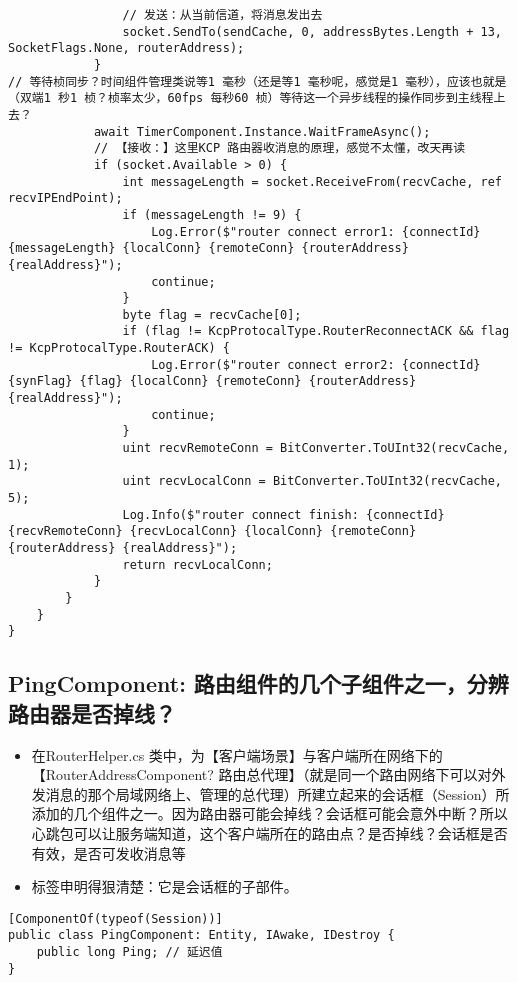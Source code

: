 \documentclass[9pt, b5paper]{article}
\begin{document}
\begin{verbatim}
                // 发送：从当前信道，将消息发出去
                socket.SendTo(sendCache, 0, addressBytes.Length + 13, SocketFlags.None, routerAddress);
            }
// 等待桢同步？时间组件管理类说等1 毫秒（还是等1 毫秒呢，感觉是1 毫秒），应该也就是（双端1 秒1 桢？桢率太少，60fps 每秒60 桢）等待这一个异步线程的操作同步到主线程上去？
            await TimerComponent.Instance.WaitFrameAsync(); 
            // 【接收：】这里KCP 路由器收消息的原理，感觉不太懂，改天再读
            if (socket.Available > 0) {
                int messageLength = socket.ReceiveFrom(recvCache, ref recvIPEndPoint);
                if (messageLength != 9) {
                    Log.Error($"router connect error1: {connectId} {messageLength} {localConn} {remoteConn} {routerAddress} {realAddress}");
                    continue;
                }
                byte flag = recvCache[0];
                if (flag != KcpProtocalType.RouterReconnectACK && flag != KcpProtocalType.RouterACK) {
                    Log.Error($"router connect error2: {connectId} {synFlag} {flag} {localConn} {remoteConn} {routerAddress} {realAddress}");
                    continue;
                }
                uint recvRemoteConn = BitConverter.ToUInt32(recvCache, 1);
                uint recvLocalConn = BitConverter.ToUInt32(recvCache, 5);
                Log.Info($"router connect finish: {connectId} {recvRemoteConn} {recvLocalConn} {localConn} {remoteConn} {routerAddress} {realAddress}");
                return recvLocalConn;
            }
        }
    }
}
\end{verbatim}
\subsection{PingComponent: 路由组件的几个子组件之一，分辨路由器是否掉线？}
\label{sec-6-6}
\begin{itemize}
\item 在RouterHelper.cs 类中，为【客户端场景】与客户端所在网络下的【RouterAddressComponent? 路由总代理】（就是同一个路由网络下可以对外发消息的那个局域网络上、管理的总代理）所建立起来的会话框（Session）所添加的几个组件之一。因为路由器可能会掉线？会话框可能会意外中断？所以心跳包可以让服务端知道，这个客户端所在的路由点？是否掉线？会话框是否有效，是否可发收消息等
\item 标签申明得狠清楚：它是会话框的子部件。
\end{itemize}
\begin{verbatim}
[ComponentOf(typeof(Session))]
public class PingComponent: Entity, IAwake, IDestroy {
    public long Ping; // 延迟值
}
\end{verbatim}
\end{document}

